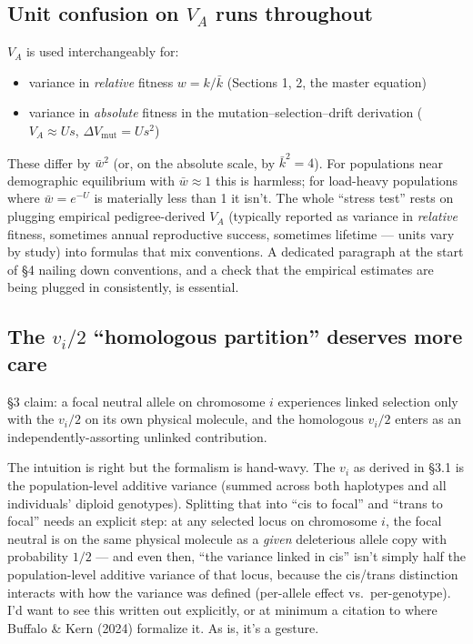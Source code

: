\documentclass[11pt]{article}
\begin{document}
\subsection{Unit confusion on $V_A$ runs throughout}

$V_A$ is used interchangeably for:
\begin{itemize}
\item variance in \emph{relative} fitness $w = k/\bar k$ (Sections 1, 2, the master equation)
\item variance in \emph{absolute} fitness in the mutation--selection--drift derivation ($V_A \approx Us$, $\Delta V_{\text{mut}} = Us^2$)
\end{itemize}
These differ by $\bar w^2$ (or, on the absolute scale, by
$\bar k^2 = 4$). For populations near demographic equilibrium with
$\bar w \approx 1$ this is harmless; for load-heavy populations where
$\bar w = e^{-U}$ is materially less than 1 it isn't. The whole
``stress test'' rests on plugging empirical pedigree-derived $V_A$
(typically reported as variance in \emph{relative} fitness, sometimes
annual reproductive success, sometimes lifetime --- units vary by
study) into formulas that mix conventions. A dedicated paragraph at
the start of \S 4 nailing down conventions, and a check that the
empirical estimates are being plugged in consistently, is essential.

\subsection{The $v_i/2$ ``homologous partition'' deserves more care}

\S 3 claim: a focal neutral allele on chromosome $i$ experiences
linked selection only with the $v_i/2$ on its own physical molecule,
and the homologous $v_i/2$ enters as an independently-assorting
unlinked contribution.

The intuition is right but the formalism is hand-wavy. The $v_i$ as
derived in \S 3.1 is the population-level additive variance (summed
across both haplotypes and all individuals' diploid genotypes).
Splitting that into ``cis to focal'' and ``trans to focal'' needs an
explicit step: at any selected locus on chromosome $i$, the focal
neutral is on the same physical molecule as a \emph{given} deleterious
allele copy with probability $1/2$ --- and even then, ``the variance
linked in cis'' isn't simply half the population-level additive
variance of that locus, because the cis/trans distinction interacts
with how the variance was defined (per-allele effect vs.\ per-genotype).
I'd want to see this written out explicitly, or at minimum a citation
to where Buffalo \& Kern (2024) formalize it. As is, it's a gesture.
\end{document}
